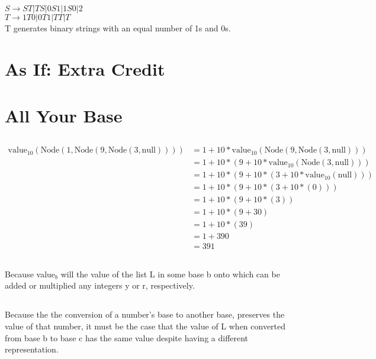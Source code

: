 \documentclass[11pt]{article}
\def\imp{\rightarrow}
\begin{document}
\subsection{}
$S \imp ST | TS | 0S1 | 1S0 | 2$ \\
$T \imp 1T0 | 0T1 | TT | T $ \\
T generates binary strings with an equal number of 1s and 0s.

\section{As If: Extra Credit} %

\section{All Your Base} %
\subsection{} %
\begin{align*}
	\text{value}_{10}(\text{Node}(1, \text{Node}(9, \text{Node}(3, \text{null})))) &= 1 + 10 * \text{value}_{10}(\text{Node}(9, \text{Node}(3, \text{null}))) \\
	&= 1 + 10 * (9 + 10 * \text{value}_{10}(\text{Node}(3, \text{null}))) \\
	&= 1 + 10 * (9 + 10 * (3 + 10 * \text{value}_{10}(\text{null}))) \\
	&= 1 + 10 * (9 + 10 * (3 + 10 * (0))) \\
	&= 1 + 10 * (9 + 10 * (3)) \\
	&= 1 + 10 * (9 + 30) \\
	&= 1 + 10 * (39) \\
	&= 1 + 390 \\
	&= 391
\end{align*}

\subsection{} %
Because value$_b$ will the value of the list L in some base b onto which can be added or multiplied any integers y or r, respectively. 

\subsection{} %
Because the the conversion of a number's base to another base, preserves the value of that number, it must be the case that the value of L when converted from base b to base c has the same value despite having a different representation. 
\end{document}
